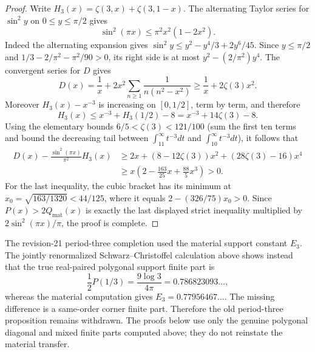 \begin{proof}
Write $H_3(x)=\zeta(3,x)+\zeta(3,1-x)$.  The alternating Taylor
series for $\sin^2y$ on $0\le y\le\pi/2$ gives
\[
 \sin^2(\pi x)\le \pi^2x^2(1-2x^2).
\]
Indeed the alternating expansion gives
$\sin^2y\le y^2-y^4/3+2y^6/45$.  Since $y\le\pi/2$ and
$1/3-2/\pi^2-\pi^2/90>0$, its right side is at most
$y^2-(2/\pi^2)y^4$.  The convergent series for $D$ gives
\[
 D(x)=\frac1x+2x^2\sum_{n\ge1}\frac1{n(n^2-x^2)}
 \ge\frac1x+2\zeta(3)x^2.
\]
Moreover $H_3(x)-x^{-3}$ is increasing on $[0,1/2]$, term by term, and
therefore
\[
 H_3(x)\le x^{-3}+H_3(1/2)-8
 =x^{-3}+14\zeta(3)-8.
\]
Using the elementary bounds $6/5<\zeta(3)<121/100$ (sum the first ten
terms and bound the decreasing tail between
$\int_{11}^\infty t^{-3}dt$ and $\int_{10}^\infty t^{-3}dt$), it follows that
\begin{align*}
 D(x)-\frac{\sin^2(\pi x)}{\pi^2}H_3(x)
 &\ge 2x+(8-12\zeta(3))x^2+(28\zeta(3)-16)x^4\\
 &\ge x\left(2-\frac{163}{25}x+\frac{88}{5}x^3\right)>0.
\end{align*}
For the last inequality, the cubic bracket has its minimum at
$x_0=\sqrt{163/1320}<44/125$, where it equals
$2-(326/75)x_0>0$.  Since
$P(x)>2Q_{\mathrm{mat}}(x)$ is exactly the last displayed strict
inequality multiplied by $2\sin^2(\pi x)/\pi$, the proof is complete.
\end{proof}

\begin{remark}
\label{JC:rem:period-three-completion-retracted}
The revision-21 period-three completion used the material support constant
$E_3$.  The jointly renormalized Schwarz--Christoffel calculation above
shows instead that the true real-paired polygonal support finite part is
\[
 \frac12P(1/3)=\frac{9\log3}{4\pi}=0.786823093\ldots,
\]
whereas the material computation gives $E_3=0.77956467\ldots$.  The
missing difference is a same-order corner finite part.  Therefore the old
period-three proposition remains withdrawn.  The proofs below use only
the genuine polygonal diagonal and mixed finite parts computed above; they
do not reinstate the material transfer.
\end{remark}

